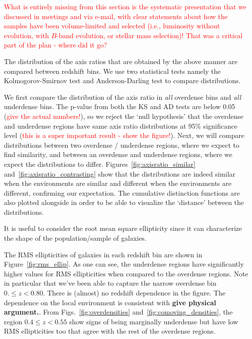 \documentclass[twocolumn,useAMS,usenatbib]{mn2e}
\newcommand{\rachel}[1]{{\textcolor{red}{#1}}}
\begin{document}
\rachel{What is entirely missing from this section is the systematic presentation that we discussed in meetings and via e-mail, with clear statements about how the samples have been volume-limited and selected (i.e., luminosity without evolution, with $B$-band evolution, or stellar mass selection)!  That was a critical part of the plan - where did it go?}

The distribution of the axis ratios that are obtained by the above manner are compared between redshift bins. We use two statistical tests namely the Kolmogorov-Smirnov test and Anderson-Darling test to compare distributions.

We first compare the distribution of the axis ratio in \emph{all}
overdense bins and \emph{all} underdense bins. The p-value from both
the KS and AD tests are below 0.05 (\rachel{give the actual numbers!}), 
so we reject the `null hypothesis' that the overdense and underdense regions have same axis ratio distributions at 95\% significance level (\rachel{this is a super important result - show the figure!}).
Next, we will compare distributions between two overdense / underdense regions, where we expect to find similarity, and between an overdense and underdense regions,
where we expect the distributions to differ.
Figures~\ref{fig:axisratio_similar} and~\ref{fig:axisratio_contrasting} show that the distributions are indeed similar when the environments are similar and different when the environments are different, confirming our expectation.
The cumulative distinction functions are also plotted alongside in order to be able to visualize the `distance' between the distributions.


It is useful to consider the root mean square ellipticity since it can characterize the shape of the population/sample of galaxies.

The RMS ellipticities of galaxies in each redshift bin are shown in Figure~\ref{fig:rms_ellip}. As one can see, the underdense regions
have significantly higher values for RMS ellipticities when compared to the overdense regions. Note in particular that we've been able to capture the narrow overdense bin $0.\le z < 0.80$.  
There is (almost) no redshift dependence in the figure.
The dependence on the local environment is consistent with {\bf give physical argument.}. 
From Figs.~\ref{fig:overdensities} and~\ref{fig:comoving_densities},
the region $0.4\le z < 0.55$ show signs of being marginally underdense but have low RMS ellipticities too that agree with the rest of the overdense regions.
\end{document}
